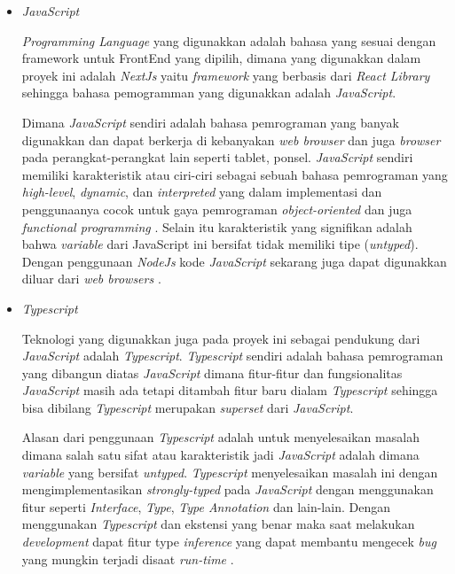 \documentclass[a4paper]{article}
\begin{document}
\begin{enumerate}[label=\alph*. ]
\begin{enumerate}
                    \begin{itemize}
                        \item \textit{JavaScript}

                        \textit{Programming Language} yang digunakkan adalah bahasa yang sesuai dengan framework untuk FrontEnd yang dipilih, dimana yang digunakkan dalam proyek ini adalah \textit{NextJs} yaitu \textit{framework} yang berbasis dari \textit{React Library} sehingga bahasa pemogramman yang digunakkan adalah \textit{JavaScript}.

                        Dimana \textit{JavaScript} sendiri adalah bahasa pemrograman yang banyak digunakkan dan dapat berkerja di kebanyakan \textit{web browser} dan juga \textit{browser} pada perangkat-perangkat lain seperti tablet, ponsel. \textit{JavaScript} sendiri memiliki karakteristik atau ciri-ciri sebagai sebuah bahasa pemrograman yang \textit{high-level}, \textit{dynamic}, dan \textit{interpreted} yang dalam implementasi dan penggunaanya cocok untuk gaya pemrograman \textit{object-oriented} dan juga \textit{functional programming} . Selain itu karakteristik yang signifikan adalah bahwa \textit{variable} dari JavaScript ini bersifat tidak memiliki tipe (\textit{untyped}). Dengan penggunaan \textit{NodeJs} kode \textit{JavaScript} sekarang juga dapat digunakkan diluar dari \textit{web browsers} \autocite{Js_book_Flanagan_2020}.

                        \item \textit{Typescript}

                        Teknologi yang digunakkan juga pada proyek ini sebagai pendukung dari \textit{JavaScript} adalah \textit{Typescript}. \textit{Typescript} sendiri adalah bahasa pemrograman yang dibangun diatas \textit{JavaScript} dimana fitur-fitur dan fungsionalitas \textit{JavaScript} masih ada tetapi ditambah fitur baru dialam \textit{Typescript} sehingga bisa dibilang \textit{Typescript} merupakan \textit{superset} dari \textit{JavaScript}.

                        Alasan dari penggunaan \textit{Typescript} adalah untuk menyelesaikan masalah dimana salah satu sifat atau karakteristik jadi \textit{JavaScript} adalah dimana \textit{variable} yang bersifat \textit{untyped}. \textit{Typescript} menyelesaikan masalah ini dengan mengimplementasikan \textit{strongly-typed} pada \textit{JavaScript} dengan menggunakan fitur seperti \textit{Interface}, \textit{Type}, \textit{Type Annotation} dan lain-lain. Dengan menggunakan \textit{Typescript} dan ekstensi yang benar maka saat melakukan \textit{development} dapat fitur type \textit{inference} yang dapat membantu mengecek \textit{bug} yang mungkin terjadi disaat \textit{run-time} \autocite{TypeScript_official}.


\end{itemize}
\end{enumerate}
\end{enumerate}
\end{document}
